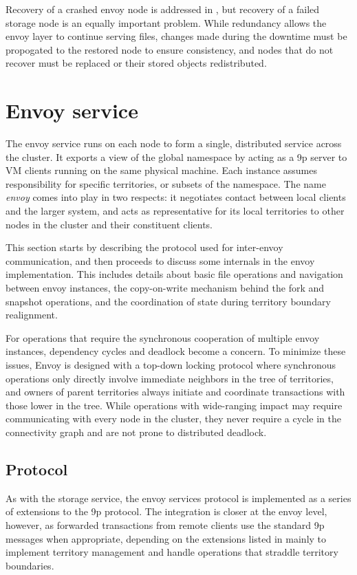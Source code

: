 Recovery of a crashed envoy node is addressed in , but recovery of a failed storage node is an equally important problem. While redundancy allows the envoy layer to continue serving files, changes made during the downtime must be propogated to the restored node to ensure consistency, and nodes that do not recover must be replaced or their stored objects redistributed.

\section{Envoy service}

The envoy service runs on each node to form a single, distributed service across the cluster. It exports a view of the global namespace by acting as a 9p server to VM clients running on the same physical machine. Each instance assumes responsibility for specific territories, or subsets of the namespace. The name \emph{envoy} comes into play in two respects: it negotiates contact between local clients and the larger system, and acts as representative for its local territories to other nodes in the cluster and their constituent clients.

This section starts by describing the protocol used for inter-envoy communication, and then proceeds to discuss some internals in the envoy implementation. This includes details about basic file operations and navigation between envoy instances, the copy-on-write mechanism behind the fork and snapshot operations, and the coordination of state during territory boundary realignment.

For operations that require the synchronous cooperation of multiple envoy instances, dependency cycles and deadlock become a concern. To minimize these issues, Envoy is designed with a top-down locking protocol where synchronous operations only directly involve immediate neighbors in the tree of territories, and owners of parent territories always initiate and coordinate transactions with those lower in the tree. While operations with wide-ranging impact may require communicating with every node in the cluster, they never require a cycle in the connectivity graph and are not prone to distributed deadlock.

\subsection{Protocol}

As with the storage service, the envoy services protocol is implemented as a series of extensions to the 9p protocol. The integration is closer at the envoy level, however, as forwarded transactions from remote clients use the standard 9p messages when appropriate, depending on the extensions listed in  mainly to implement territory management and handle operations that straddle territory boundaries.

